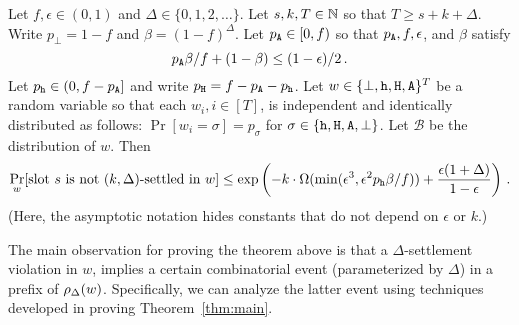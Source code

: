 

    \begin{theorem}\label{thm:main-async}
      Let $f, \epsilon \in (0,1)$ and $\Delta \in \{0, 1, 2, \ldots\}$. 
      Let $s, k, T \in \mathbb{N}$ so that $T \geq s + k + \Delta$. 
      Write $p_\perp = 1 - f$ and $\beta = (1 - f)^\Delta$. 
      Let $p_{\mathtt{A}} \in [0, f)$ so that $p_{\mathtt{A}}, f, \epsilon$, and $\beta$ 
      satisfy 
      \begin{equation}\label{eq:condition-prob-delta}
        p_{\mathtt{A}}  \beta/f + (1 - \beta) \leq (1 - \epsilon)/2 
        \,.
      \end{equation}      
      Let $p_{\mathtt{h}} \in (0, f - p_{\mathtt{A}}]$ and write $p_{\mathtt{H}} = f - p_{\mathtt{A}} - p_{\mathtt{h}}$. 
      Let $w \in \{\perp, \mathtt{h}, \mathtt{H}, \mathtt{A}\}^T$ be a random variable 
      so that each 
      $w_i, i \in [T]$, is independent and identically distributed as
      follows: $\Pr[w_i = \sigma] = p_\sigma$ for
      $\sigma \in \{\mathtt{h}, \mathtt{H}, \mathtt{A}, \perp\}$. 
      Let $\mathcal{B}$ be the distribution of $w$. 
      Then 
      $$
        \Pr_w[\text{slot $s$ is not $(k, \Delta)$-settled in $w$}]  
          \leq
        \exp\left( 
          -k\cdot \Omega(\min(\epsilon^3, \epsilon^2 p_{\mathtt{h}} \beta/f ) ) 
          + 
          \frac{\epsilon(1+\Delta)}{1 - \epsilon} 
        \right)
        \,.
      $$
      (Here, the asymptotic notation hides constants that do not depend on $\epsilon$ or $k$.)
    \end{theorem}
    
  
    The main observation for proving the theorem above is that 
    a $\Delta$-settlement violation in $w$, 
    implies a certain combinatorial event (parameterized by $\Delta$) 
    in a prefix of $\rho_\Delta(w)$. 
    Specifically, we can analyze the latter event 
    using techniques developed in proving Theorem~\ref{thm:main}. 

